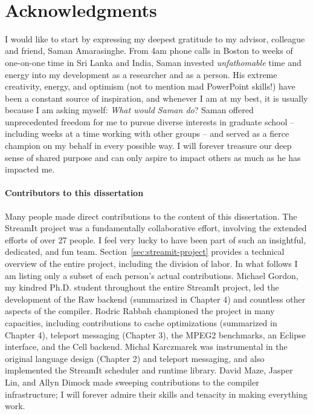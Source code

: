 \newpage
~ \vspace{-3.7\baselineskip}\\
\enlargethispage{0.3\baselineskip}
\section*{Acknowledgments}

I would like to start by expressing my deepest gratitude to my
advisor, colleague and friend, Saman Amarasinghe.
From 4am phone calls in Boston to weeks of one-on-one time in Sri
Lanka and India, Saman invested {\it unfathomable} time and energy
into my development as a researcher and as a person.  His extreme
creativity, energy, and optimism (not to mention mad PowerPoint
skills!) have been a constant source of inspiration, and whenever I am
at my best, it is usually because I am asking myself: {\it What would
Saman do}?  Saman offered unprecedented freedom for me to pursue
diverse interests in graduate school -- including weeks at a time
working with other groups -- and served as a fierce champion on my
behalf in every possible way.  I will forever treasure our deep sense
of shared purpose and can only aspire to impact others as much as he
has impacted me.


\vspace{-8pt}\paragraph*{Contributors to this dissertation} Many
people made direct contributions to the content of this
dissertation.  The StreamIt project was a fundamentally
collaborative effort, involving the extended efforts of over 27
people.  I feel very lucky to have been part of such an insightful,
dedicated, and fun team.  Section~\ref{sec:streamit-project}
provides a technical overview of the entire project, including the
division of labor.  In what follows I am listing only a subset of
each person's actual contributions.  Michael Gordon, my kindred
Ph.D. student throughout the entire StreamIt project, led the
development of the Raw backend (summarized in Chapter 4) and
countless other aspects of the compiler.  Rodric Rabbah championed
the project in many capacities, including contributions to cache
optimizations (summarized in Chapter 4), teleport messaging (Chapter
3), the MPEG2 benchmarks, an Eclipse interface, and the Cell
backend.  Michal Karczmarek was instrumental in the original
language design (Chapter 2) and teleport messaging, and also
implemented the StreamIt scheduler and runtime library.  David Maze,
Jasper Lin, and Allyn Dimock made sweeping contributions to the
compiler infrastructure; I will forever admire their skills and
tenacity in making everything work.


